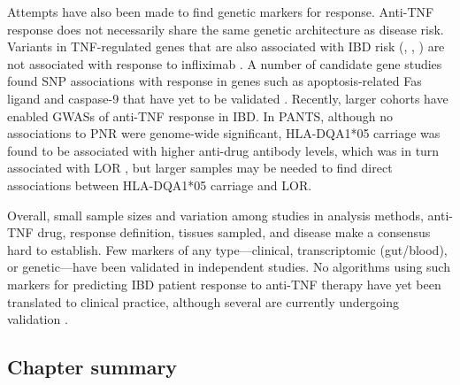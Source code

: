 Attempts have also been made to find genetic markers for response.
Anti-\gls{TNF} response does not necessarily share the same genetic architecture as disease risk.
Variants in \gls{TNF}-regulated genes that are also associated with \gls{IBD} risk (, , ) are not associated with response to infliximab \autocite{digby-bell2019InterrogatingHostImmunity,noor2020PersonalisedMedicineCrohn}.
A number of candidate gene studies found \gls{SNP} associations with response in genes such as apoptosis-related Fas ligand and caspase-9 that have yet to be validated \autocite{flamant2018InflammatoryBowelDisease,burke2018GeneticMarkersPredict}.
Recently, larger cohorts have enabled \glspl{GWAS} of anti-\gls{TNF} response in \gls{IBD}.
In \gls{PANTS}, although no associations to \gls{PNR} were genome-wide significant,
HLA-DQA1*05 carriage was found to be associated with higher anti-drug antibody levels, which was in turn associated with \gls{LOR} \autocite{sazonovs2019HLADQA105Carriage}, but larger samples may be needed to find direct associations between HLA-DQA1*05 carriage and \gls{LOR}.

Overall, small sample sizes and variation among studies in analysis methods, anti-\gls{TNF} drug, response definition, tissues sampled, and disease make a consensus hard to establish.
Few markers of any type---clinical, transcriptomic (gut/blood), or genetic---have been validated in independent studies.
No algorithms using such markers for predicting \gls{IBD} patient response to anti-\gls{TNF} therapy have yet been translated to clinical practice,
although several are currently undergoing validation \autocite{noor2020PersonalisedMedicineCrohn}.

\subsection{Chapter summary}

